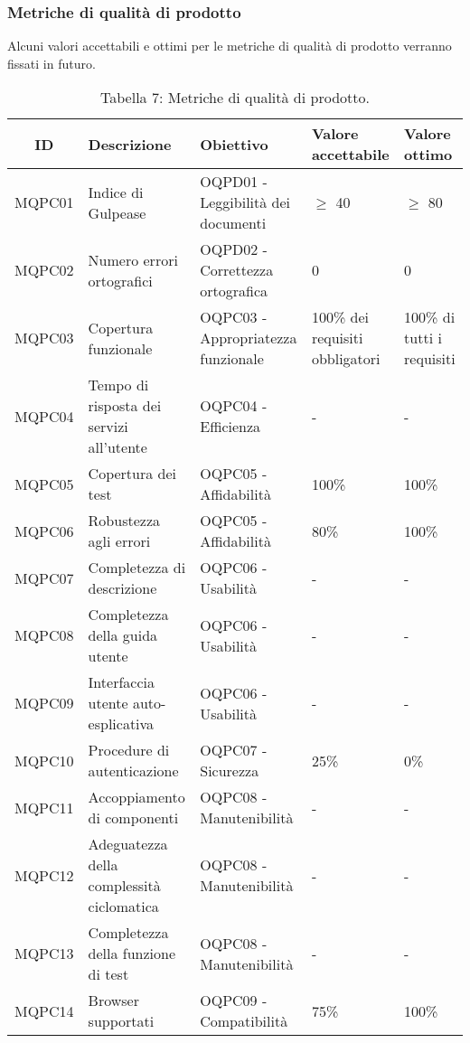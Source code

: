 \subsubsection{Metriche di qualità di prodotto}
Alcuni valori accettabili e ottimi per le metriche di qualità di prodotto verranno fissati in futuro.
\begin{table}[H]
	\centering
	\begin{tabularx}{\textwidth}{|c|X|X|X|X|}
		\hline
		\textbf{ID} & \textbf{Descrizione} & \textbf{Obiettivo} & \textbf{Valore accettabile} & \textbf{Valore ottimo}\\
		\hline
		MQPC01 & Indice di Gulpease & OQPD01 - Leggibilità dei documenti & $\geq$ 40 & $\geq$ 80 \\
		\hline
		MQPC02 & Numero errori ortografici & OQPD02 - Correttezza ortografica & 0 & 0 \\
		\hline
		MQPC03 & Copertura funzionale & OQPC03 - Appropriatezza funzionale & 100\% dei requisiti obbligatori & 100\% di tutti i requisiti\\
		\hline
		MQPC04 & Tempo di risposta dei servizi all'utente & OQPC04 - Efficienza & - & - \\
		\hline
		MQPC05 & Copertura dei test & OQPC05 - Affidabilità & 100\% & 100\% \\
		\hline
		MQPC06 & Robustezza agli errori & OQPC05 - Affidabilità & 80\% & 100\% \\
		\hline
		MQPC07 & Completezza di descrizione & OQPC06 - Usabilità & - &  - \\
		\hline
		MQPC08 & Completezza della guida utente & OQPC06 - Usabilità & - &  - \\
		\hline
		MQPC09 & Interfaccia utente auto-esplicativa & OQPC06 - Usabilità & - &  - \\
		\hline
		MQPC10 & Procedure di autenticazione & OQPC07 - Sicurezza & 25\% &  0\% \\
		\hline
		MQPC11 & Accoppiamento di componenti & OQPC08 - Manutenibilità & - & - \\
		\hline
		MQPC12 & Adeguatezza della complessità ciclomatica & OQPC08 - Manutenibilità & - & - \\
		\hline
		MQPC13 & Completezza della funzione di test & OQPC08 - Manutenibilità & - & - \\
		\hline
		MQPC14 & Browser supportati & OQPC09 - Compatibilità & 75\% & 100\% \\
		\hline
	\end{tabularx}
	\caption{Tabella 7: Metriche di qualità di prodotto.}
\end{table}
